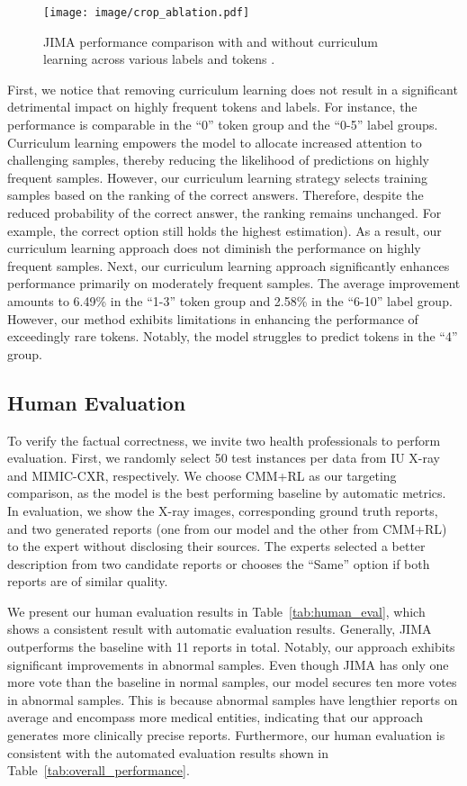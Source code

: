 \documentclass[sn-mathphys-num]{sn-jnl}%
\theoremstyle{thmstyleone}%
\theoremstyle{thmstyletwo}%
\theoremstyle{thmstylethree}%
\begin{document}
\begin{figure}[htp]
    \centering 
    \caption{ JIMA performance comparison with and without curriculum learning across various labels and tokens .}    \texttt{[image: image/crop\_ablation.pdf]}
    \label{fig:ablation}
\end{figure}

First, we notice that removing curriculum learning does not result in a significant detrimental impact on highly frequent tokens and labels. For instance, the performance is comparable in the ``0'' token group and the ``0-5'' label groups. Curriculum learning empowers the model to allocate increased attention to challenging samples, thereby reducing the likelihood of predictions on highly frequent samples. However, our curriculum learning strategy selects training samples based on the ranking of the correct answers. Therefore, despite the reduced probability of the correct answer, the ranking remains unchanged. For example, the correct option still holds the highest estimation). As a result, our curriculum learning approach does not diminish the performance on highly frequent samples.
Next, our curriculum learning approach significantly enhances performance primarily on moderately frequent samples. The average improvement amounts to 6.49\% in the ``1-3'' token group and 2.58\% in the ``6-10'' label group. However, our method exhibits limitations in enhancing the performance of exceedingly rare tokens. Notably, the model struggles to predict tokens in the ``4'' group.

\subsection{Human Evaluation}
To verify the factual correctness, we invite two health professionals to perform evaluation. 
First, we randomly select 50 test instances per data from IU X-ray and MIMIC-CXR, respectively.
We choose CMM+RL as our targeting comparison, as the model is the best performing baseline by automatic metrics. 
In evaluation, we show the X-ray images, corresponding ground truth reports, and two generated reports (one from our model and the other from CMM+RL) to the expert without disclosing their sources. 
The experts selected a better description from two candidate reports or chooses the ``Same'' option if both reports are of similar quality.

We present our human evaluation results in Table~\ref{tab:human_eval}, which shows a consistent result with automatic evaluation results. 
Generally, JIMA outperforms the baseline with 11 reports in total.  
Notably, our approach exhibits significant improvements in abnormal samples. 
Even though JIMA has only one more vote than the baseline in normal samples, our model secures ten more votes in abnormal samples. 
This is because abnormal samples have lengthier reports on average and encompass more medical entities, indicating that our approach generates more clinically precise reports.
Furthermore, our human evaluation is consistent with the automated evaluation results shown in Table~\ref{tab:overall_performance}.
\end{document}

